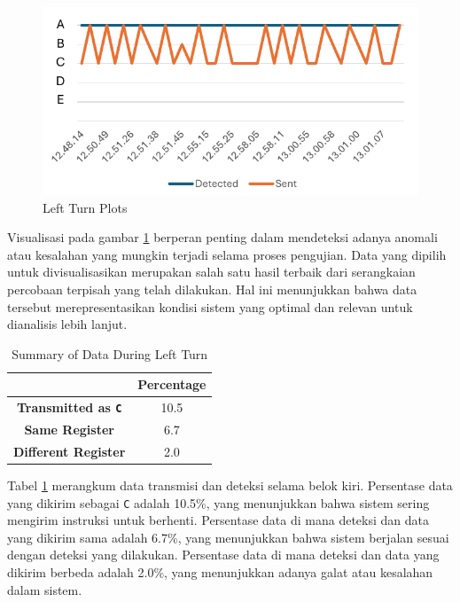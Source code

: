 \begin{figure}[H]
    \centering
    \includegraphics[width=1\textwidth]{gambar/tex/left.pdf}
    \caption{Left Turn Plots}
    \label{fig:left_turn_plots}
\end{figure}

Visualisasi pada gambar \ref{fig:left_turn_plots} berperan penting dalam mendeteksi adanya anomali atau kesalahan yang mungkin terjadi selama proses pengujian. Data yang dipilih untuk divisualisasikan merupakan salah satu hasil terbaik dari serangkaian percobaan terpisah yang telah dilakukan. Hal ini menunjukkan bahwa data tersebut merepresentasikan kondisi sistem yang optimal dan relevan untuk dianalisis lebih lanjut.

\begin{table}[H]
    \centering
    \caption{Summary of Data During Left Turn}
    \label{tab:left_turn_data_transmission_detection}
    \begin{tabular}{|c|c|}
        \hline 
        \cellcolor[HTML]{000000} & \cellcolor[HTML]{C0C0C0} \textbf{Percentage}  \\ \hline
        \cellcolor[HTML]{C0C0C0} \textbf{Transmitted as \texttt{C}} & 10.5 \\ \hline
        \cellcolor[HTML]{C0C0C0} \textbf{Same Register}  & 6.7 \\ \hline
        \cellcolor[HTML]{C0C0C0} \textbf{Different Register}   & 2.0 \\ \hline
    \end{tabular}
\end{table}

Tabel \ref{tab:left_turn_data_transmission_detection} merangkum data transmisi dan deteksi selama belok kiri. Persentase data yang dikirim sebagai \texttt{C} adalah 10.5\%, yang menunjukkan bahwa sistem sering mengirim instruksi untuk berhenti. Persentase data di mana deteksi dan data yang dikirim sama adalah 6.7\%, yang menunjukkan bahwa sistem berjalan sesuai dengan deteksi yang dilakukan. Persentase data di mana deteksi dan data yang dikirim berbeda adalah 2.0\%, yang menunjukkan adanya galat atau kesalahan dalam sistem.

